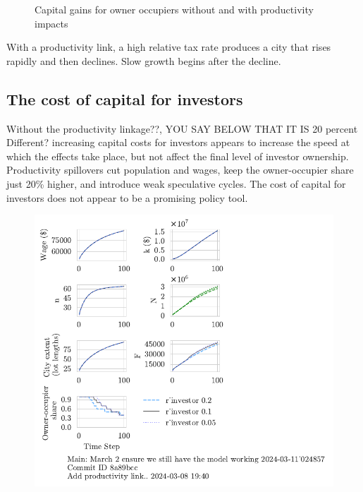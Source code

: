 {\begin{figure}[h!tb]
    \caption{Capital gains for owner occupiers without and with productivity impacts}
    \label{fig:CG-pers_link_W-WO-Cost-of-capital}
\end{figure}

With a productivity link, a high relative tax rate produces a city that rises rapidly and then declines. Slow growth begins after the decline.

\newpage
\subsection{The cost of capital for investors}



{\color{red}Without the productivity linkage??, YOU SAY BELOW THAT IT IS 20 percent Different?} increasing capital costs for investors appears to increase the speed at which the effects take place, but not affect the final level of investor ownership. Productivity spillovers cut population and wages, keep the owner-occupier share just 20\% higher, and introduce weak speculative cycles. The cost of capital for investors does not appear to be a promising policy tool.
\begin{figure}[h!tb] 
    \centering
    \includegraphics[scale=.75, trim={0 1.4cm 4cm 0},clip]{fig/r_investor-Main-024857.pdf} 

\end{figure}}
